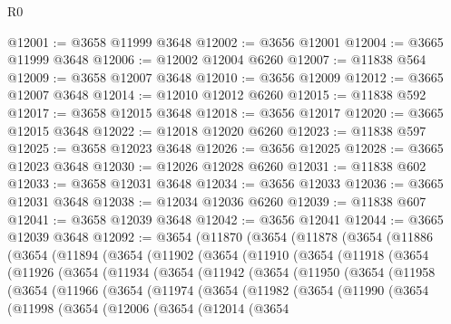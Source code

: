 \begin{lexlean}{R0}
\begin{coremodule}
@12001 := @3658 @11999 @3648
@12002 := @3656 @12001
@12004 := @3665 @11999 @3648
@12006 := @12002 @12004 @6260
@12007 := @11838 @564
@12009 := @3658 @12007 @3648
@12010 := @3656 @12009
@12012 := @3665 @12007 @3648
@12014 := @12010 @12012 @6260
@12015 := @11838 @592
@12017 := @3658 @12015 @3648
@12018 := @3656 @12017
@12020 := @3665 @12015 @3648
@12022 := @12018 @12020 @6260
@12023 := @11838 @597
@12025 := @3658 @12023 @3648
@12026 := @3656 @12025
@12028 := @3665 @12023 @3648
@12030 := @12026 @12028 @6260
@12031 := @11838 @602
@12033 := @3658 @12031 @3648
@12034 := @3656 @12033
@12036 := @3665 @12031 @3648
@12038 := @12034 @12036 @6260
@12039 := @11838 @607
@12041 := @3658 @12039 @3648
@12042 := @3656 @12041
@12044 := @3665 @12039 @3648
@12092 := @3654
    (@11870
      (@3654
        (@11878
          (@3654
            (@11886
              (@3654
                (@11894
                  (@3654
                    (@11902
                      (@3654
                        (@11910
                          (@3654
                            (@11918
                              (@3654
                                (@11926
                                  (@3654
                                    (@11934
                                      (@3654
                                        (@11942
                                          (@3654
                                            (@11950
                                              (@3654
                                                (@11958
                                                  (@3654
                                                    (@11966
                                                      (@3654
                                                        (@11974
                                                          (@3654
                                                            (@11982
                                                              (@3654
                                                                (@11990
                                                                  (@3654
                                                                    (@11998
                                                                      (@3654
                                                                        (@12006
                                                                          (@3654
                                                                            (@12014
                                                                              (@3654

\end{coremodule}
\end{lexlean}
